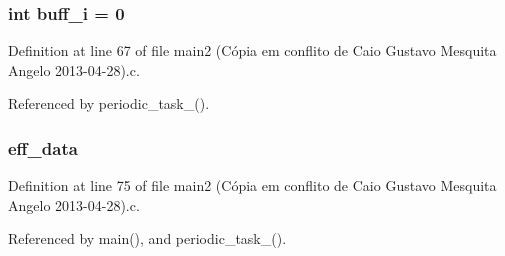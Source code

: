 \hypertarget{main2_01_07C_xC3_xB3pia_01em_01conflito_01de_01Caio_01Gustavo_01Mesquita_01Angelo_012013-04-28_08_8c_ac0f4eb3a1def152855159c698feaf977}{
\subsubsection[{buff\-\_\-i}]{\setlength{\rightskip}{0pt plus 5cm}int buff\-\_\-i = 0}}\label{main2_01_07C_xC3_xB3pia_01em_01conflito_01de_01Caio_01Gustavo_01Mesquita_01Angelo_012013-04-28_08_8c_ac0f4eb3a1def152855159c698feaf977}


Definition at line 67 of file main2 (\-Cópia em conflito de Caio Gustavo Mesquita Angelo 2013-\/04-\/28).\-c.



Referenced by periodic\-\_\-task\-\_().

\hypertarget{main2_01_07C_xC3_xB3pia_01em_01conflito_01de_01Caio_01Gustavo_01Mesquita_01Angelo_012013-04-28_08_8c_a5650ece8c3a277c7f158d75ae65265fa}{
\subsubsection[{eff\-\_\-data}]{ eff\-\_\-data}}\label{main2_01_07C_xC3_xB3pia_01em_01conflito_01de_01Caio_01Gustavo_01Mesquita_01Angelo_012013-04-28_08_8c_a5650ece8c3a277c7f158d75ae65265fa}


Definition at line 75 of file main2 (\-Cópia em conflito de Caio Gustavo Mesquita Angelo 2013-\/04-\/28).\-c.



Referenced by main(), and periodic\-\_\-task\-\_().

